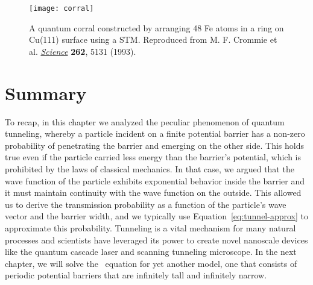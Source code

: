 \begin{figure}[!h]
	\centering
	\texttt{[image: corral]}
	\caption{A quantum corral constructed by arranging 48 Fe atoms in a ring on Cu(111) surface using a STM. Reproduced from M. F. Crommie et al. \href{http://science.sciencemag.org/content/262/5131/218}{\emph{Science}} \textbf{262}, 5131 (1993).}
	\label{fig:corral}
\end{figure}




\section{Summary}
To recap, in this chapter we analyzed the peculiar phenomenon of quantum tunneling, whereby a particle incident on a finite potential barrier has a non-zero probability of penetrating the barrier and emerging on the other side. This holds true even if the particle carried less energy than the barrier's potential, which is prohibited by the laws of classical mechanics. In that case, we argued that the wave function of the particle exhibits exponential behavior inside the barrier and it must maintain continuity with the wave function on the outside. This allowed us to derive the transmission probability as a function of the particle's wave vector and the barrier width, and we typically use Equation~\ref{eq:tunnel-approx} to approximate this probability. Tunneling is a vital mechanism for many natural processes and scientists have leveraged its power to create novel nanoscale devices like the quantum cascade laser and scanning tunneling microscope. In the next chapter, we will solve the \Sch\ equation for yet another model, one that consists of periodic potential barriers that are infinitely tall and infinitely narrow.


%